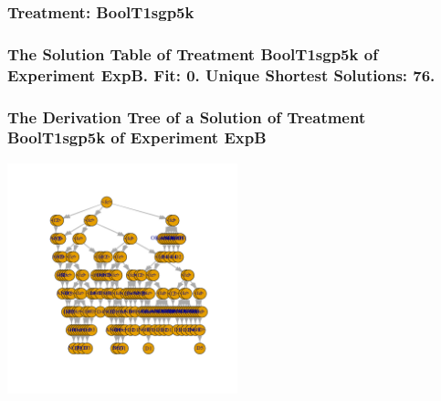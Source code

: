 \documentclass[18pt,c]{beamer}
\begin{document}
 \begin{frame}
 \fontsize{8pt}{9pt}\selectfont
 \frametitle{ Treatment: BoolT1sgp5k }

 \label{ExpBStatsTable015.tex}  
 \end{frame}

 \begin{frame}
 \fontsize{8pt}{9pt}\selectfont
 \frametitle{ The Solution Table of Treatment BoolT1sgp5k of Experiment ExpB. Fit: 0. Unique Shortest Solutions: 76. }

 \label{ExpBSolutionTable008.tex}  
 \end{frame}

 \begin{frame}
 \frametitle{ The Derivation Tree of a Solution of Treatment BoolT1sgp5k of Experiment ExpB }
 \begin{center}
\includegraphics[width=0.5\textwidth, angle=0]
{ExpBDerivationTreeFigure008.pdf}
 \end{center}
 \label{report/ExpBDerivationTreeFigure008.pdf}  
 \end{frame}
\end{document}
